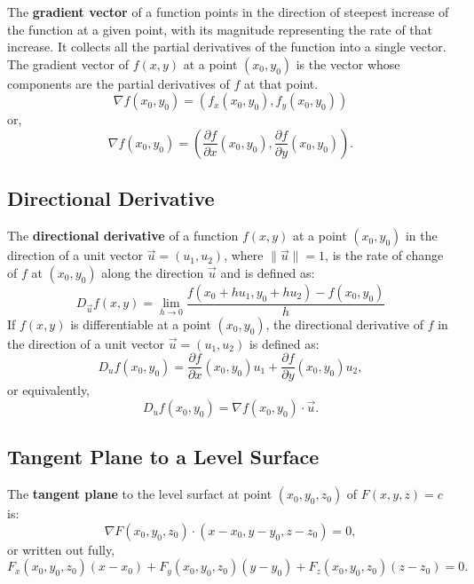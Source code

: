 \documentclass[a4paper,11pt]{article}
\begin{document}
\begin{tcolorbox}
    The \textbf{gradient vector} of a function points in the direction of steepest increase of the function at a given point, with its magnitude representing the rate of that increase. It collects all the partial derivatives of the function into a single vector. \\
    
    The gradient vector of $f(x,y)$ at a point $(x_0,y_0)$ is the vector whose components are the partial derivatives of $f$ at that point.
    \[
    \nabla f(x_0,y_0) = \left( f_x (x_0,y_0),f_y (x_0,y_0) \right)
    \]
    or,
    \[
    \nabla f(x_0,y_0) = \left( \frac{\partial f}{\partial x} (x_0,y_0), \frac{\partial f}{\partial y} (x_0,y_0) \right).
    \]
\end{tcolorbox}




\subsection{Directional Derivative}

\begin{tcolorbox}
    The \textbf{directional derivative} of a function $f(x,y)$ at a point $(x_0,y_0)$ in the direction of a unit vector $\vec{u}=(u_1, u_2)$, where $ \| \vec{u} \| = 1 $, is the rate of change of $f$ at $(x_0,y_0)$ along the direction $\vec{u}$ and is defined as:
    \[
    D_{\vec{u}} f(x,y) = \lim_{h \to 0} \frac{f(x_0 + hu_1, y_0 + hu_2) - f(x_0,y_0)}{h}
    \]
    If $f(x,y)$ is differentiable at a point $(x_0,y_0)$, the directional derivative of $f$ in the direction of a unit vector $\vec{u}=(u_1,u_2)$ is defined as:
    \[
    D_u f(x_0,y_0) = \frac{\partial f}{\partial x} (x_0,y_0) u_1 + \frac{\partial f}{\partial y} (x_0,y_0) u_2,
    \]
    or equivalently,
    \[
    D_u f(x_0,y_0) = \nabla f(x_0,y_0) \cdot \vec{u}.
    \]
\end{tcolorbox}




\subsection{Tangent Plane to a Level Surface}

\begin{tcolorbox}
    The \textbf{tangent plane} to the level surfact at point $(x_0,y_0,z_0)$ of $F(x,y,z)=c$ is:
    \[
    \nabla F(x_0,y_0,z_0) \cdot (x-x_0,y-y_0,z-z_0)=0,
    \]
    or written out fully,
    \[
    F_x(x_0,y_0,z_0)(x-x_0) + F_y(x_0,y_0,z_0)(y-y_0) + F_z(x_0,y_0,z_0)(z-z_0) = 0.
    \]
\end{tcolorbox}
\end{document}
